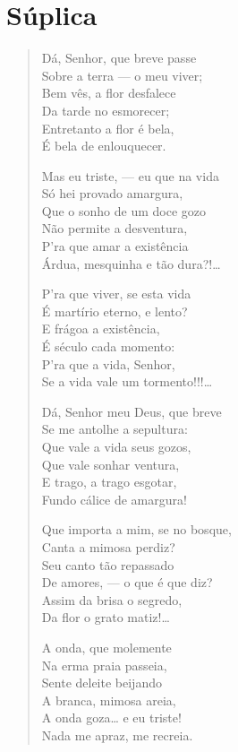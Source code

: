 \chapter{Súplica}

\begin{verse}
Dá, Senhor, que breve passe\\
Sobre a terra --- o meu viver;\\
Bem vês, a flor desfalece\\
Da tarde no esmorecer;\\
Entretanto a flor é bela,\\
É bela de enlouquecer.

Mas eu triste, --- eu que na vida\\
Só hei provado amargura,\\
Que o sonho de um doce gozo\\
Não permite a desventura,\\
P'ra que amar a existência\\
Árdua, mesquinha e tão dura?!\ldots{}

P'ra que viver, se esta vida\\
É martírio eterno, e lento?\\
E frágoa a existência,\\
É século cada momento:\\
P'ra que a vida, Senhor,\\
Se a vida vale um tormento!!!\ldots{}

Dá, Senhor meu Deus, que breve\\
Se me antolhe a sepultura:\\
Que vale a vida seus gozos,\\
Que vale sonhar ventura,\\
E trago, a trago esgotar,\\
Fundo cálice de amargura!

Que importa a mim, se no bosque,\\
Canta a mimosa perdiz?\\
Seu canto tão repassado\\
De amores, --- o que é que diz?\\
Assim da brisa o segredo,\\
Da flor o grato matiz!\ldots{}

A onda, que molemente\\
Na erma praia passeia,\\
Sente deleite beijando\\
A branca, mimosa areia,\\
A onda goza\ldots{} e eu triste!\\
Nada me apraz, me recreia.


\end{verse}
